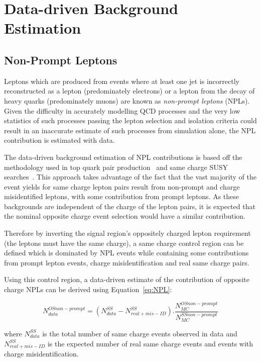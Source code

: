 \section{Data-driven Background Estimation}\label{sec:dataDrivenBackground}

\subsection{Non-Prompt Leptons}\label{sec:NPLs}
Leptons which are produced from events where at least one jet is incorrectly reconstructed as a lepton (predominately electrons) or a lepton from the decay of heavy quarks (predominately muons) are known as \emph{non-prompt leptons} (NPLs).
Given the difficulty in accurately modelling QCD processes and the very low statistics of such processes passing the lepton selection and isolation criteria could result in an inaccurate estimate of such processes from simulation alone, the NPL contribution is estimated with data.

The data-driven background estimation of NPL contributions is based off the methodology used in top quark pair production~\cite{CMS:2016syx} and same charge SUSY searches~\cite{CMS:2015vqc}.
This approach takes advantage of the fact that the vast majority of the event yields for same charge lepton pairs result from non-prompt and charge misidentified leptons, with some contribution from prompt leptons.
As these backgrounds are independent of the charge of the lepton pairs, it is expected that the nominal opposite charge event selection would have a similar contribution.

Therefore by inverting the signal region's oppositely charged lepton requirement (\ie the leptons must have the same charge), a same charge control region can be defined which is dominated by NPL events while containing some contributions from prompt lepton events, charge misidentification and real same charge pairs.

Using this control region, a data-driven estimate of the contribution of opposite charge NPLs can be derived using Equation~\ref{eq:NPL}:

\begin{equation}\label{eq:NPL}
 N_{data}^{OS non-prompt} = (N_{data}^{SS} - N^{SS}_{real + mis-ID}).\frac{N_{MC}^{OS non-prompt}}{N_{MC}^{SS non-prompt}}
\end{equation}

where $N_{data}^{SS}$ is the total number of same charge events observed in data and $N^{SS}_{real + mis-ID}$ is the expected number of real same charge events and events with charge misidentification.

